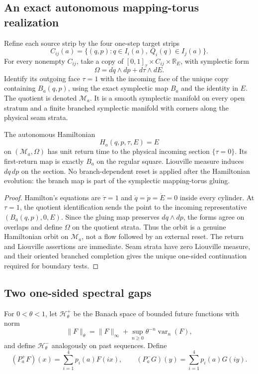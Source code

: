 \subsection{An exact autonomous mapping-torus realization}

Refine each source strip by the four one-step target strips
\[
 C_{ij}(a)=\{(q,p):q\in I_i(a),\ Q_i(q)\in I_j(a)\}.
\]
For every nonempty \(C_{ij}\), take a copy of
\([0,1]_\tau\times C_{ij}\times\mathbb R_E\), with symplectic form
\[
 \Omega=dq\wedge dp+d\tau\wedge dE.
\]
Identify its outgoing face \(\tau=1\) with the incoming face of the unique
copy containing \(B_a(q,p)\), using the exact symplectic map \(B_a\) and the
identity in \(E\).  The quotient is denoted \(\mathcal M_a\).  It is a smooth
symplectic manifold on every open stratum and a finite branched symplectic
manifold with corners along the physical seam strata.

\begin{theorem}
\label{thm:r10-a1-suspension}
The autonomous Hamiltonian
\[
 H_a(q,p,\tau,E)=E
\]
on \((\mathcal M_a,\Omega)\) has unit return time to the physical incoming
section \(\{\tau=0\}\).  Its first-return map is exactly \(B_a\) on the
regular square.  Liouville measure induces \(dq\,dp\) on the section.  No
branch-dependent reset is applied after the Hamiltonian evolution: the branch
map is part of the symplectic mapping-torus gluing.
\end{theorem}

\begin{proof}
Hamilton's equations are \(\dot\tau=1\) and
\(\dot q=\dot p=\dot E=0\) inside every cylinder.  At \(\tau=1\), the quotient
identification sends the point to the incoming representative
\((B_a(q,p),0,E)\).  Since the gluing map preserves \(dq\wedge dp\), the
forms agree on overlaps and define \(\Omega\) on the quotient strata.  Thus
the orbit is a genuine Hamiltonian orbit on \(\mathcal M_a\), not a flow
followed by an external reset.  The return and Liouville assertions are
immediate.  Seam strata have zero Liouville measure, and their oriented
branched completion gives the unique one-sided continuation required for
boundary tests.
\end{proof}

\subsection{Two one-sided spectral gaps}

For \(0<\theta<1\), let \(\mathscr H_\theta^+\) be the Banach space of bounded
future functions with norm
\[
 \|F\|_\theta=\|F\|_\infty+
 \sup_{n\ge0}\theta^{-n}\operatorname{var}_n(F),
\]
and define \(\mathscr H_\theta^-\) analogously on past sequences.  Define
\[
 (P_a^+F)(x)=\sum_{i=1}^4p_i(a)F(ix),
 \qquad
 (P_a^-G)(y)=\sum_{i=1}^4p_i(a)G(iy).
\]

